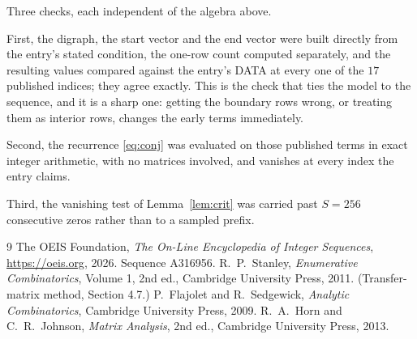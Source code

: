 \documentclass[11pt,a4paper]{article}
\theoremstyle{plain}
\theoremstyle{definition}
\begin{document}
Three checks, each independent of the algebra above.

First, the digraph, the start vector and the end vector were built directly from the
entry's stated condition, the one-row count computed separately, and the resulting values
compared against the entry's DATA at every one of the $17$ published indices; they
agree exactly. This is the check that ties the model to the sequence, and it is a sharp one:
getting the boundary rows wrong, or treating them as interior rows, changes the early terms
immediately.

Second, the recurrence \eqref{eq:conj} was evaluated on those published terms in exact
integer arithmetic, with no matrices involved, and vanishes at every index the entry claims.

Third, the vanishing test of Lemma~\ref{lem:crit} was carried past $S=256$ consecutive
zeros rather than to a sampled prefix.

\begin{thebibliography}{9}
 The OEIS Foundation, \emph{The On-Line Encyclopedia of Integer
Sequences}, \url{https://oeis.org}, 2026. Sequence A316956.
 R.~P.~Stanley, \emph{Enumerative Combinatorics}, Volume 1, 2nd ed.,
Cambridge University Press, 2011. (Transfer-matrix method, Section 4.7.)
 P.~Flajolet and R.~Sedgewick, \emph{Analytic Combinatorics}, Cambridge
University Press, 2009.
 R.~A.~Horn and C.~R.~Johnson, \emph{Matrix Analysis}, 2nd ed., Cambridge
University Press, 2013.
\end{thebibliography}
\end{document}
